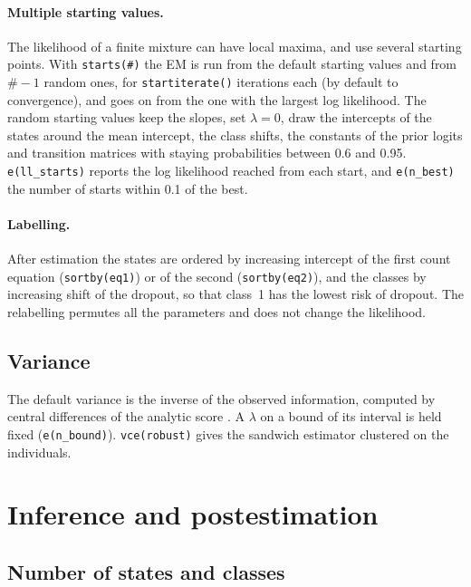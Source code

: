 \documentclass[11pt,a4paper]{article}
\newcommand{\cmd}[1]{\texttt{#1}}
\begin{document}
\paragraph{Multiple starting values.} The likelihood of a finite mixture can have local maxima, and
\citet{carrieri2026} use several starting points. With \cmd{starts(\#)} the EM is run from the default
starting values and from $\#-1$ random ones, for \cmd{startiterate()} iterations each (by default to
convergence), and goes on from the one with the largest log likelihood. The random starting values keep
the slopes, set $\lambda=0$, draw the intercepts of the states around the mean intercept, the class
shifts, the constants of the prior logits and transition matrices with staying probabilities between
0.6 and 0.95. \cmd{e(ll\_starts)} reports the log likelihood reached from each start, and
\cmd{e(n\_best)} the number of starts within 0.1 of the best.

\paragraph{Labelling.} After estimation the states are ordered by increasing intercept of the first count
equation (\cmd{sortby(eq1)}) or of the second (\cmd{sortby(eq2)}), and the classes by increasing shift
of the dropout, so that class~1 has the lowest risk of dropout. The relabelling permutes all the
parameters and does not change the likelihood.

\subsection{Variance}

The default variance is the inverse of the observed information, computed by central differences of the
analytic score \citep{mclachlan2000}. A $\lambda$ on a bound of its interval is held fixed
(\cmd{e(n\_bound)}). \cmd{vce(robust)} gives the sandwich estimator clustered on the individuals.

\section{Inference and postestimation}\label{sec:post}

\subsection{Number of states and classes}
\end{document}
